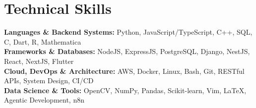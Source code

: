 \medskip

\resumeItemListStart
{}
\resumeItemListEnd
\resumeItemListEnd

\resumeSubHeadingListEnd

\section{Technical Skills}
\begin{itemize}[leftmargin=0.15in, label={}]
  \small{\item{
        \textbf{Languages \& Backend Systems:} {Python, JavaScript/TypeScript, C++, SQL, C, Dart, R, Mathematica} \\
        \textbf{Frameworks \& Databases:} {NodeJS, ExpressJS, PostgreSQL, Django, NestJS, React, NextJS, Flutter} \\
        \textbf{Cloud, DevOps \& Architecture:} {AWS, Docker, Linux, Bash, Git, RESTful APIs, System Design, CI/CD} \\
        \textbf{Data Science \& Tools:} {OpenCV, NumPy, Pandas, Scikit-learn, Vim, \LaTeX\EndAccSupp{}, Agentic Development, n8n} \\
        }}
\end{itemize}
